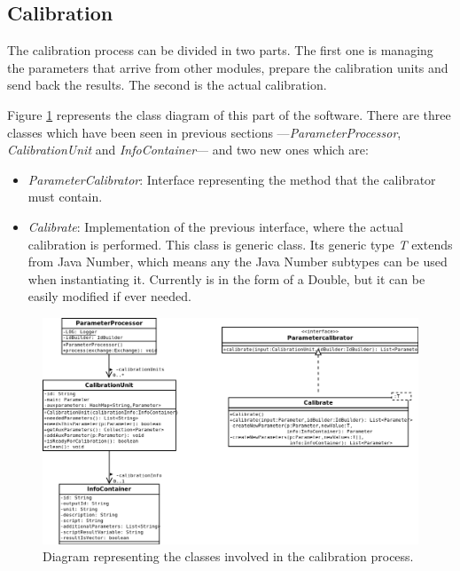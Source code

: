 \subsection{Calibration}
The calibration process can be divided in two parts. The first one is managing the parameters that arrive from other modules, prepare the calibration units and send back the results. The second is the actual calibration. 

Figure \ref{f5.4} represents the class diagram of this part of the software. There are three classes which have been seen in previous sections ---\emph{ParameterProcessor}, \emph{CalibrationUnit} and \emph{InfoContainer}--- and two new ones which are:
\begin{itemize}
\item \emph{ParameterCalibrator}: Interface representing the method that the calibrator must contain.
\item \emph{Calibrate}: Implementation of the previous interface, where the actual calibration is performed. This class is generic class. Its generic type \emph{T} extends from Java Number, which means any the Java Number subtypes can be used when instantiating it. Currently is in the form of a Double, but it can be easily modified if ever needed.
\end{itemize}


\begin{figure}[H]
\centerline{\includegraphics[width=1.2\textwidth]{images/CalibrationClassDiagram.png}}
\caption{Diagram representing the classes involved in the calibration process.}
\label{f5.4}
\end{figure}

